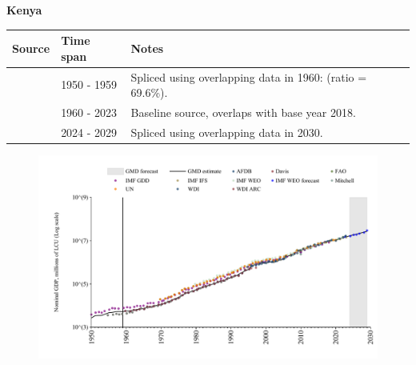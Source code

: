 \documentclass[12pt,a4paper,landscape]{article}
\begin{document}
\begin{adjustbox}{max totalsize={\paperwidth}{\paperheight},center}
\begin{minipage}[t][\textheight][t]{\textwidth}
\vspace*{0.5cm}
{}
\begin{center}
{\Large\bfseries Kenya}
\end{center}
\vspace{0.5cm}
\begin{table}[H]
\centering
\small
\begin{tabular}{|l|l|l|}
\hline
\textbf{Source} & \textbf{Time span} & \textbf{Notes} \\
\hline
\rowcolor{white}\cite{IMF_GDD}& 1950 - 1959 &Spliced using overlapping data in 1960: (ratio = 69.6\%).\\
\rowcolor{lightgray}\cite{WDI}& 1960 - 2023 &Baseline source, overlaps with base year 2018.\\
\rowcolor{white}\cite{IMF_WEO_forecast}& 2024 - 2029 &Spliced using overlapping data in 2030.\\
\hline
\end{tabular}
\end{table}
\begin{figure}[H]
\centering
\includegraphics[width=\textwidth,height=0.6\textheight,keepaspectratio]{graphs/KEN_nGDP.pdf}
\end{figure}
\end{minipage}
\end{adjustbox}
\end{document}
